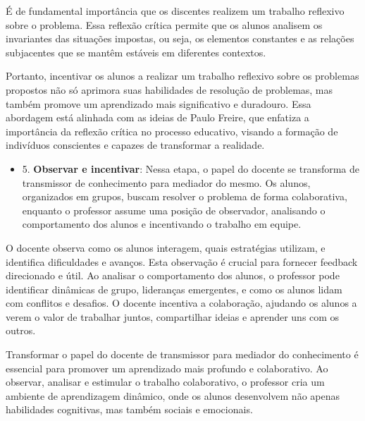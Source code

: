 É de fundamental importância que os discentes realizem um trabalho reflexivo sobre o problema. Essa reflexão crítica permite que os alunos analisem os invariantes das situações impostas, ou seja, os elementos constantes e as relações subjacentes que se mantêm estáveis em diferentes contextos.

Portanto, incentivar os alunos a realizar um trabalho reflexivo sobre os problemas propostos não só aprimora suas habilidades de resolução de problemas, mas também promove um aprendizado mais significativo e duradouro. Essa abordagem está alinhada com as ideias de Paulo Freire, que enfatiza a importância da reflexão crítica no processo educativo, visando a formação de indivíduos conscientes e capazes de transformar a realidade.


\begin{itemize}
    \item 5. \textbf{Observar e incentivar}: Nessa etapa, o papel do docente se transforma de transmissor de conhecimento para mediador do mesmo. Os alunos, organizados em grupos, buscam resolver o problema de forma colaborativa, enquanto o professor assume uma posição de observador, analisando o comportamento dos alunos e incentivando o trabalho em equipe.
\end{itemize}

O docente observa como os alunos interagem, quais estratégias utilizam, e identifica dificuldades e avanços. Esta observação é crucial para fornecer feedback direcionado e útil. Ao analisar o comportamento dos alunos, o professor pode identificar dinâmicas de grupo, lideranças emergentes, e como os alunos lidam com conflitos e desafios. O docente incentiva a colaboração, ajudando os alunos a verem o valor de trabalhar juntos, compartilhar ideias e aprender uns com os outros.

Transformar o papel do docente de transmissor para mediador do conhecimento é essencial para promover um aprendizado mais profundo e colaborativo. Ao observar, analisar e estimular o trabalho colaborativo, o professor cria um ambiente de aprendizagem dinâmico, onde os alunos desenvolvem não apenas habilidades cognitivas, mas também sociais e emocionais.


